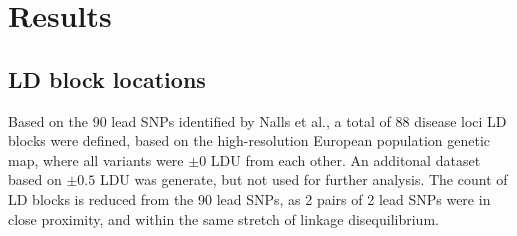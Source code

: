 \documentclass{article}
\begin{document}
\section{Results}
\subsection{LD block locations}
\label{subsec:blocks}
Based on the 90 lead SNPs identified by Nalls et al.\cite{Nalls2019IdentificationStudies}, a total of 88 disease loci LD blocks were defined, based on the high-resolution European population genetic map\cite{Maniatis2004PositionalDisequilibrium.}, where all variants were $\pm 0$ LDU from each other. An additonal dataset based on $\pm 0.5$ LDU was generate, but not used for further analysis. The count of LD blocks is reduced from the 90 lead SNPs, as 2 pairs of 2 lead SNPs were in close proximity, and within the same stretch of linkage disequilibrium.
\end{document}
